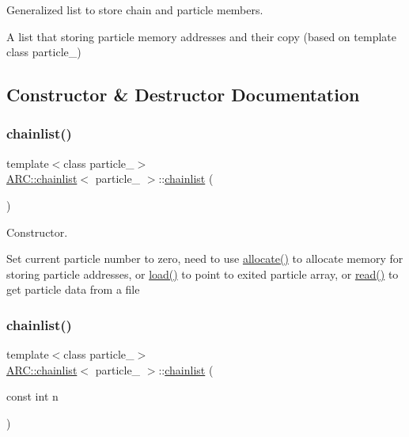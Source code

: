 Generalized list to store chain and particle members. 

A list that storing particle memory addresses and their copy (based on template class particle\+\_\+) 

\subsection{Constructor \& Destructor Documentation}
\hypertarget{classARC_1_1chainlist_a12641a795a63d6152c22fc4b363e28c1}{}\label{classARC_1_1chainlist_a12641a795a63d6152c22fc4b363e28c1} 
\subsubsection{\texorpdfstring{chainlist()}{chainlist()}\hspace{0.1cm}{\footnotesize\ttfamily [1/2]}}
{\footnotesize\ttfamily template$<$class particle\+\_\+$>$ \\
\hyperlink{classARC_1_1chainlist}{A\+R\+C\+::chainlist}$<$ particle\+\_\+ $>$\+::\hyperlink{classARC_1_1chainlist}{chainlist} (\begin{DoxyParamCaption}{ }\end{DoxyParamCaption})\hspace{0.3cm}{\ttfamily [inline]}}



Constructor. 

Set current particle number to zero, need to use \hyperlink{classARC_1_1chainlist_a5efea9e6b234b5f2d20693468398a177}{allocate()} to allocate memory for storing particle addresses, or \hyperlink{classARC_1_1chainlist_a0b6d027aa684f6db74fa75f418dbdd70}{load()} to point to exited particle array, or \hyperlink{classARC_1_1chainlist_adfa67e2ccdbdfd7ed945fa7617f90ecc}{read()} to get particle data from a file \hypertarget{classARC_1_1chainlist_a5ea89068d9a738fc9619a1ff89e7bb81}{}\label{classARC_1_1chainlist_a5ea89068d9a738fc9619a1ff89e7bb81} 
\subsubsection{\texorpdfstring{chainlist()}{chainlist()}\hspace{0.1cm}{\footnotesize\ttfamily [2/2]}}
{\footnotesize\ttfamily template$<$class particle\+\_\+$>$ \\
\hyperlink{classARC_1_1chainlist}{A\+R\+C\+::chainlist}$<$ particle\+\_\+ $>$\+::\hyperlink{classARC_1_1chainlist}{chainlist} (\begin{DoxyParamCaption}\item[{const int}]{n }\end{DoxyParamCaption})\hspace{0.3cm}{\ttfamily [inline]}}




